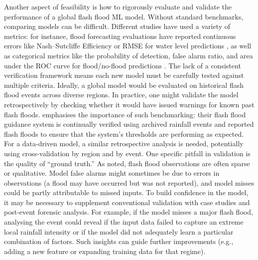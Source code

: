 Another aspect of feasibility is how to rigorously evaluate and validate the performance of a global flash flood ML model. Without standard benchmarks, comparing models can be difficult. Different studies have used a variety of metrics: for instance, flood forecasting evaluations have reported continuous errors like Nash–Sutcliffe Efficiency or RMSE for water level predictions \citep{Oddo2024}, as well as categorical metrics like the probability of detection, false alarm ratio, and area under the ROC curve for flood/no-flood predictions \citep{Saber2022}. The lack of a consistent verification framework means each new model must be carefully tested against multiple criteria. Ideally, a global model would be evaluated on historical flash flood events across diverse regions. In practice, one might validate the model retrospectively by checking whether it would have issued warnings for known past flash floods. \citet{Georgakakos2022} emphasises the importance of such benchmarking: their flash flood guidance system is continually verified using archived rainfall events and reported flash floods to ensure that the system’s thresholds are performing as expected. For a data-driven model, a similar retrospective analysis is needed, potentially using cross-validation by region and by event. One specific pitfall in validation is the quality of “ground truth.” As noted, flash flood observations are often sparse or qualitative. Model false alarms might sometimes be due to errors in observations (a flood may have occurred but was not reported), and model misses could be partly attributable to missed inputs. To build confidence in the model, it may be necessary to supplement conventional validation with case studies and post-event forensic analysis. For example, if the model misses a major flash flood, analysing the event could reveal if the input data failed to capture an extreme local rainfall intensity or if the model did not adequately learn a particular combination of factors. Such insights can guide further improvements (e.g., adding a new feature or expanding training data for that regime). 

